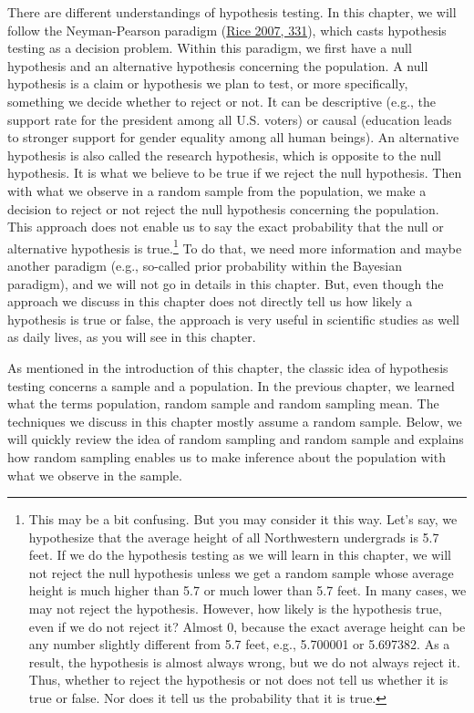 \documentclass{book}
\begin{document}
There are different understandings of hypothesis testing. In this chapter, we
will follow the Neyman-Pearson paradigm
(\protect\hyperlink{ref-rice2007math}{Rice 2007, 331}), which casts hypothesis
testing as a decision problem. Within this paradigm, we first have a null
hypothesis and an alternative hypothesis concerning the population. A null
hypothesis is a claim or hypothesis we plan to test, or more specifically,
something we decide whether to reject or not. It can be descriptive (e.g., the
support rate for the president among all U.S. voters) or causal (education
leads to stronger support for gender equality among all human beings). An
alternative hypothesis is also called the research hypothesis, which is
opposite to the null hypothesis. It is what we believe to be true if we reject
the null hypothesis. Then with what we observe in a random sample from the
population, we make a decision to reject or not reject the null hypothesis
concerning the population. This approach does not enable us to say the exact
probability that the null or alternative hypothesis is true.\footnote{This may
  be a bit confusing. But you may consider it this way. Let's say, we
  hypothesize that the average height of all Northwestern undergrads is 5.7
  feet. If we do the hypothesis testing as we will learn in this chapter, we
  will not reject the null hypothesis unless we get a random sample whose
  average height is much higher than 5.7 or much lower than 5.7 feet. In many
  cases, we may not reject the hypothesis. However, how likely is the
  hypothesis true, even if we do not reject it? Almost 0, because the exact
  average height can be any number slightly different from 5.7 feet, e.g.,
  5.700001 or 5.697382. As a result, the hypothesis is almost always wrong,
  but we do not always reject it. Thus, whether to reject the hypothesis or
  not does not tell us whether it is true or false. Nor does it tell us the
  probability that it is true.} To do that, we need more information and maybe
another paradigm (e.g., so-called prior probability within the Bayesian
paradigm), and we will not go in details in this chapter. But, even though the
approach we discuss in this chapter does not directly tell us how likely a
hypothesis is true or false, the approach is very useful in scientific studies
as well as daily lives, as you will see in this chapter.

As mentioned in the introduction of this chapter, the classic idea of
hypothesis testing concerns a sample and a population. In the previous
chapter, we learned what the terms population, random sample and random
sampling mean. The techniques we discuss in this chapter mostly assume a
random sample. Below, we will quickly review the idea of random sampling and
random sample and explains how random sampling enables us to make inference
about the population with what we observe in the sample.
\end{document}
